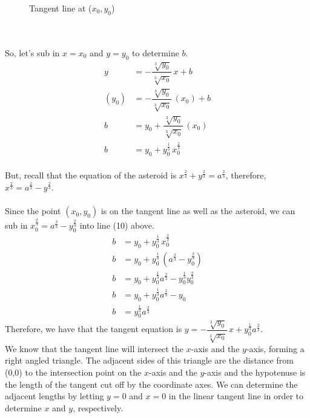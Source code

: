 \documentclass[12pt]{book}
\begin{document}
\begin{enumerate}
\begin{minipage}{0.5\textwidth}
\begin{figure}[H]
    \caption{Tangent line at ($x_0, y_0$)}
    \end{figure}
\end{minipage}\\\\
So, let's sub in $x=x_0$ and $y=y_0$ to determine $b$.
\begin{align}
    y &= -\dfrac{\sqrt[3]{y_0}}{\sqrt[3]{x_0}}\,x + b \\
    (y_0) &= -\dfrac{\sqrt[3]{y_0}}{\sqrt[3]{x_0}}\,(x_0) + b \\
    b &= y_0 + \dfrac{\sqrt[3]{y_0}}{\sqrt[3]{x_0}}\,(x_0) \\
    b &= y_0 + y_0^{\frac{1}{3}} \, x_0^{\frac{2}{3}}
\end{align}\\

But, recall that the equation of the asteroid is $x^{\frac{2}{3}} + y^{\frac{2}{3}} = a^{\frac{2}{3}}$, therefore, $x^{\frac{2}{3}} = a^{\frac{2}{3}} - y^{\frac{2}{3}}$.\\\\
Since the point $(x_0,y_0)$ is on the tangent line as well as the asteroid, we can sub in $x_0^{\frac{2}{3}} = a^{\frac{2}{3}} - y_0^{\frac{2}{3}}$ into line (10) above.
\begin{align}
    b &= y_0 + y_0^{\frac{1}{3}} \, x_0^{\frac{2}{3}} \\
    b &= y_0 + y_0^{\frac{1}{3}} \, \left(a^{\frac{2}{3}} - y_0^{\frac{2}{3}}\right) \\
    b &= y_0 + y_0^{\frac{1}{3}}a^{\frac{2}{3}} - y_0^{\frac{1}{3}}y_0^{\frac{2}{3}} \\
    b &= y_0 + y_0^{\frac{1}{3}}a^{\frac{2}{3}} - y_0 \\
    b &= y_0^{\frac{1}{3}}a^{\frac{2}{3}}
\end{align}
Therefore, we have that the tangent equation is $y = -\dfrac{\sqrt[3]{y_0}}{\sqrt[3]{x_0}}\,x + y_0^{\frac{1}{3}}a^{\frac{2}{3}}$.\\

We know that the tangent line will intersect the $x$-axis and the $y$-axis, forming a right angled triangle. The adjacent sides of this triangle are the distance from (0,0) to the intersection point on the $x$-axis and the $y$-axis and the hypotenuse is the length of the tangent cut off by the coordinate axes. We can determine the adjacent lengths by letting $y=0$ and $x=0$ in the linear tangent line in order to determine $x$ and $y$, respectively.\\


\end{enumerate}
\end{document}
